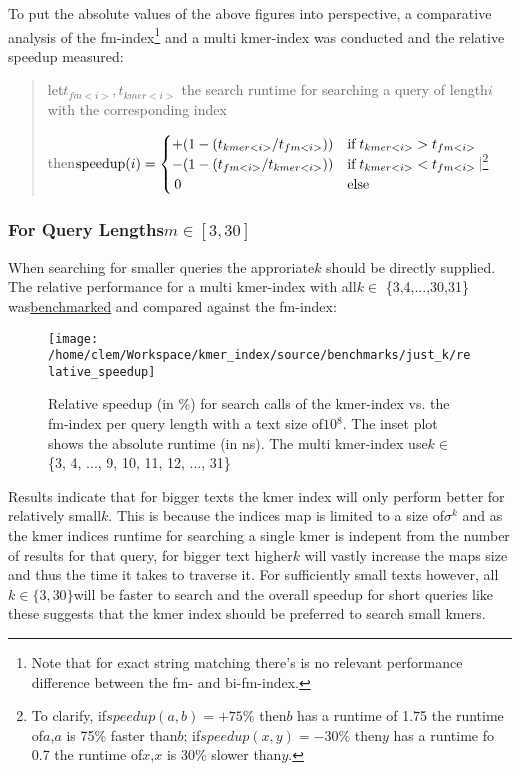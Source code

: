 To put the absolute values of the above figures into perspective,
a comparative analysis of the fm-index\footnote{Note that for exact string matching there's is no relevant performance
difference between the fm- and bi-fm-index.} and a multi kmer-index was conducted and the relative speedup measured:
\begin{verse}
let$t_{fm<i>},t_{kmer<i>}$ the search runtime for searching a query
of length$i$ with the corresponding index

then$\text{{speedup}}(i)=\begin{cases}
+(1-(t_{kmer<i>}/t_{fm<i>})) & \text{{if}\;}t_{kmer<i>}>t_{fm<i>}\\
-(1-(t_{fm<i>}/t_{kmer<i>})) & \text{{if}\;}t_{kmer<i>}<t_{fm<i>}\\
\,0 & \text{{else}}
\end{cases}$|\footnote{To clarify, if$speedup(a,b)=+75\%$ then$b$ has a runtime of 1.75
the runtime of$a$,$a$ is 75\% faster than$b$; if$speedup(x,y)=-30\%$
then$y$ has a runtime fo 0.7 the runtime of$x$,$x$ is 30\% slower
than$y$.}
\end{verse}

\subsubsection{For Query Lengths$m\in[3,30]$}

When searching for smaller queries the approriate$k$ should be directly
supplied. The relative performance for a multi kmer-index with all$k\in$
\{3,4,...,30,31\} was\href{https://github.com/google/benchmark}{benchmarked}
and compared against the fm-index:

\begin{figure}[H]
\texttt{[image: /home/clem/Workspace/kmer\_index/source/benchmarks/just\_k/relative\_speedup]}

\caption{Relative speedup (in \%) for search calls of the kmer-index vs. the
fm-index per query length with a text size of$10{{}^8}$. The inset
plot shows the absolute runtime (in ns). The multi kmer-index use$k\in$
\{3, 4, ..., 9, 10, 11, 12, ..., 31\}}
\end{figure}

Results indicate that for bigger texts the kmer index will only perform
better for relatively small$k$. This is because the indices map is
limited to a size of$\sigma^{k}$ and as the kmer indices runtime
for searching a single kmer is indepent from the number of results
for that query, for bigger text higher$k$ will vastly increase the
maps size and thus the time it takes to traverse it. For sufficiently
small texts however, all$k\in\{3,30\}$will be faster to search and
the overall speedup for short queries like these suggests that the
kmer index should be preferred to search small kmers.

